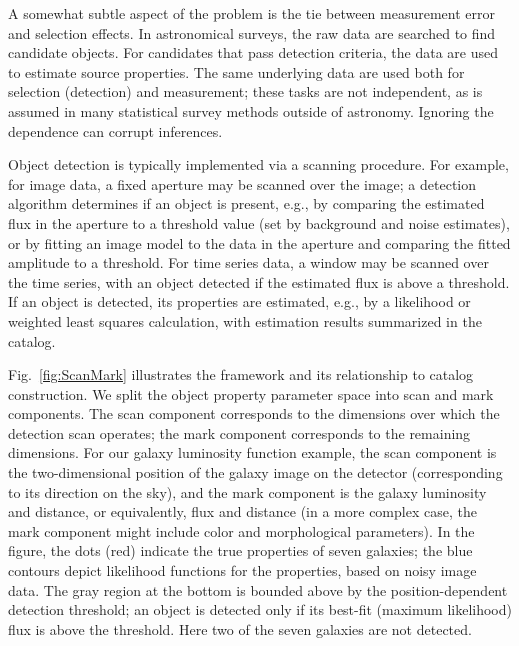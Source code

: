 A somewhat subtle aspect of the problem is the tie between measurement error and selection effects.
In astronomical surveys, the raw data are searched to find candidate objects.
For candidates that pass detection criteria, the data are used to estimate source properties.
The same underlying data are used both for selection (detection) and measurement; these tasks are not independent, as is assumed in many statistical survey methods outside of astronomy.
Ignoring the dependence can corrupt inferences.

Object detection is typically implemented via a scanning procedure.
For example, for image data, a fixed aperture may be scanned over the image; a detection algorithm determines if an object is present, e.g., by comparing the estimated flux in the aperture to a threshold value (set by background and noise estimates), or by fitting an image model to the data in the aperture and comparing the fitted amplitude to a threshold.
For time series data, a window may be scanned over the time series, with an object detected if the estimated flux is above a threshold.
If an object is detected, its properties are estimated, e.g., by a likelihood or weighted least squares calculation, with estimation results summarized in the catalog.

Fig.~\ref{fig:ScanMark} illustrates the framework and its relationship to catalog construction.
We split the object property parameter space into scan and mark components.
The scan component corresponds to the dimensions over which the detection scan operates; 
the mark component corresponds to the remaining dimensions.
For our galaxy luminosity function example, the scan component is the two-dimensional position of the galaxy image on the detector (corresponding to its direction on the sky), and the mark component is the galaxy luminosity and distance, or equivalently, flux and distance (in a more complex case, the mark component might include color and morphological parameters).
In the figure, the dots (red) indicate the true properties of seven galaxies; the blue contours depict likelihood functions for the properties, based on noisy image data.
The gray region at the bottom is bounded above by the position-dependent detection threshold; an object is detected only if its best-fit (maximum likelihood) flux is above the threshold.
Here two of the seven galaxies are not detected.

